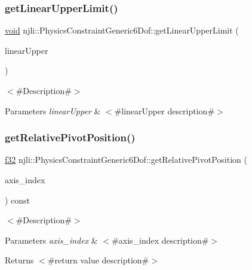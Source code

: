 \subsubsection{\texorpdfstring{get\+Linear\+Upper\+Limit()}{getLinearUpperLimit()}}
{\footnotesize\ttfamily \mbox{\hyperlink{_thread_8h_af1e856da2e658414cb2456cb6f7ebc66}{void}} njli\+::\+Physics\+Constraint\+Generic6\+Dof\+::get\+Linear\+Upper\+Limit (\begin{DoxyParamCaption}\item[{bt\+Vector3 \&}]{linear\+Upper }\end{DoxyParamCaption})}

$<$\#\+Description\#$>$


\begin{DoxyParams}{Parameters}
{\em linear\+Upper} & $<$\#linear\+Upper description\#$>$ \\
\hline
\end{DoxyParams}
\mbox{\label{classnjli_1_1_physics_constraint_generic6_dof_a80989ad0ca61c764fc63c9404229cbd6}} 
\subsubsection{\texorpdfstring{get\+Relative\+Pivot\+Position()}{getRelativePivotPosition()}}
{\footnotesize\ttfamily \mbox{\hyperlink{_util_8h_a5f6906312a689f27d70e9d086649d3fd}{f32}} njli\+::\+Physics\+Constraint\+Generic6\+Dof\+::get\+Relative\+Pivot\+Position (\begin{DoxyParamCaption}\item[{int}]{axis\+\_\+index }\end{DoxyParamCaption}) const}

$<$\#\+Description\#$>$


\begin{DoxyParams}{Parameters}
{\em axis\+\_\+index} & $<$\#axis\+\_\+index description\#$>$\\
\hline
\end{DoxyParams}
\begin{DoxyReturn}{Returns}
$<$\#return value description\#$>$ 
\end{DoxyReturn}
\mbox{\label{classnjli_1_1_physics_constraint_generic6_dof_a831494acf79eaff54aa1d95d3d1c7f0e}} 
